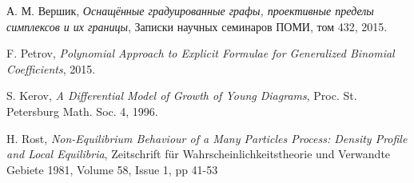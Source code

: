 \documentclass[12pt]{report}
\begin{document}
\newpage
\begin{thebibliography}{9}

  А. М. Вершик,
  \emph{Оснащённые градуированные графы, проективные пределы симплексов и их границы},
  Записки научных семинаров ПОМИ,
  том 432,
  2015.
  
  F. Petrov,
  \emph{Polynomial Approach to Explicit Formulae for
  Generalized Binomial Coefficients},
  2015.
  
    S. Kerov,
    \emph{A Differential Model of Growth of Young Diagrams}, Proc. St. Petersburg Math. Soc. 4,
    1996.
    
    H. Rost,
    \emph{Non-Equilibrium Behaviour of a Many Particles Process: Density Profile and Local Equilibria}, Zeitschrift für Wahrscheinlichkeitstheorie und Verwandte Gebiete
    1981, Volume 58, Issue 1, pp 41-53
\end{thebibliography}
\end{document}
